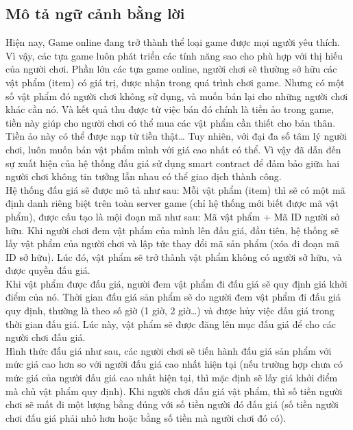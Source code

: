 \documentclass[a4paper]{article}
\begin{document}
\subsection{Mô tả ngữ cảnh bằng lời}

Hiện nay, Game online đang trở thành thể loại game được mọi người yêu thích. Vì vậy, các tựa game luôn phát triển các tính năng sao cho phù hợp với thị hiếu của người chơi. Phần lớn các tựa game online, người chơi sẽ thường sở hữu các vật phẩm (item) có giá trị, được nhận trong quá trình chơi game. Nhưng có một số vật phẩm đó người chơi không sử dụng, và muốn bán lại cho những người chơi khác cần nó. Và kết quả thu được từ việc bán đó chính là tiền ảo trong game, tiền này giúp cho người chơi có thể mua các vật phẩm cần thiết cho bản thân. Tiền ảo này có thể được nạp từ tiền thật… Tuy nhiên, với đại đa số tâm lý người chơi, luôn muốn bán vật phẩm mình với giá cao nhất có thể. Vì vậy đã dẫn đến sự xuất hiện của hệ thống đấu giá sử dụng smart contract để đảm bảo giữa hai người chơi không tin tưởng lẫn nhau có thể giao dịch thành công.\\

	Hệ thống đấu giá sẽ được mô tả như sau: Mỗi vật phẩm (item) thì sẽ có một mã định danh riêng biệt trên toàn server game (chỉ hệ thống mới biết được mã vật phẩm), được cấu tạo là mội đoạn mã như sau: Mã vật phẩm +  Mã ID người sở hữu. Khi người chơi đem vật phẩm của mình lên đấu giá, đầu tiên, hệ thống sẽ lấy vật phẩm của người chơi và lập tức thay đổi mã sản phẩm (xóa đi đoạn mã ID sở hữu). Lúc đó, vật phẩm sẽ trở thành vật phẩm không có người sở hữu, và được quyền đấu giá.  \\
	
Khi vật phẩm được đấu giá, người đem vật phẩm đi đấu giá sẽ quy định giá khởi điểm của nó. Thời gian đấu giá sản phẩm sẽ do người đem vật phẩm đi đấu giá quy định, thường là theo số giờ (1 giờ, 2 giờ…) và được hủy việc đấu giá trong thời gian đấu giá. Lúc này, vật phẩm sẽ được đăng lên mục đấu giá để cho các người chơi đấu giá. \\

Hình thức đấu giá như sau, các người chơi sẽ tiến hành đấu giá sản phẩm với mức giá cao hơn so với người đấu giá cao nhất hiện tại (nếu trường hợp chưa có mức giá của người đấu giá cao nhất hiện tại, thì mặc định sẽ lấy giá khởi điểm mà chủ vật phẩm quy định). Khi người chơi đấu giá vật phẩm, thì số tiền người chơi sẽ mất đi một lượng bằng đúng với số tiền người đó đấu giá (số tiền người chơi đấu giá phải nhỏ hơn hoặc bằng số tiền mà người chơi đó có). \\
\end{document}
